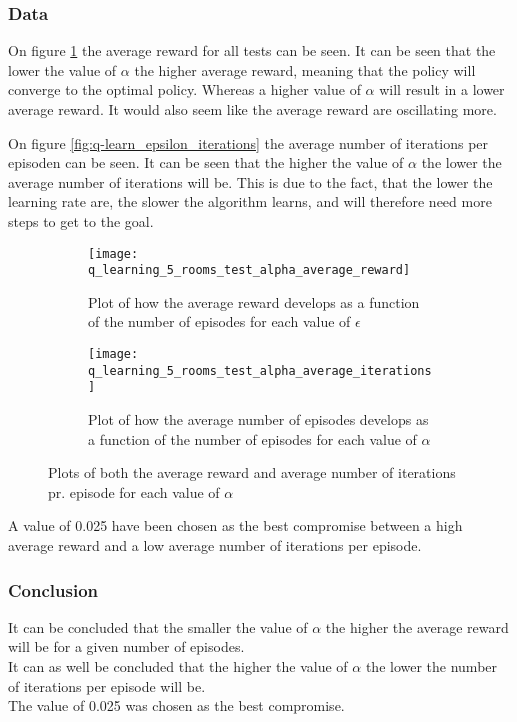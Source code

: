 \documentclass[../Head/Main.tex]{subfiles}
\begin{document}
\clearpage
\subsubsection{Data}
On figure \ref{fig:q-learn_alpha_reward} the average reward for all tests can be seen. It can be seen that the lower the value of $\alpha$ the higher average reward, meaning that the policy will converge to the optimal policy. Whereas a higher value of $\alpha$ will result in a lower average reward. It would also seem like the average reward are oscillating more.\par
On figure \ref{fig:q-learn_epsilon_iterations} the average number of iterations per episoden can be seen. It can be seen that the higher the value of $\alpha$ the lower the average number of iterations will be. This is due to the fact, that the lower the learning rate are, the slower the algorithm learns, and will therefore need more steps to get to the goal.
\begin{figure}[H]
	\centering
	\begin{subfigure}[b]{0.49\textwidth}
		\centering
		\texttt{[image: q\_learning\_5\_rooms\_test\_alpha\_average\_reward]}
		\caption{Plot of how the average reward develops as a function of the number of episodes for each value of $\epsilon$}
		\label{fig:q-learn_alpha_reward}
	\end{subfigure}
	\hfill
	\begin{subfigure}[b]{0.49\textwidth}
		\centering
		\texttt{[image: q\_learning\_5\_rooms\_test\_alpha\_average\_iterations]}
		\caption{Plot of how the average number of episodes develops as a function of the number of episodes for each value of $\alpha$}
		\label{fig:q-learn_alpha_iterations}
	\end{subfigure}
	\caption{Plots of both the average reward and average number of iterations pr. episode for each value of $\alpha$}
	\label{fig:q-learn_alpha}
\end{figure}
A value of 0.025 have been chosen as the best compromise between a high average reward and a low average number of iterations per episode.

\subsubsection{Conclusion}
It can be concluded that the smaller the value of $\alpha$ the higher the average reward will be for a given number of episodes.\\
It can as well be concluded that the higher the value of $\alpha$ the lower the number of iterations per episode will be.\\ 
The value of 0.025 was chosen as the best compromise.
\end{document}
